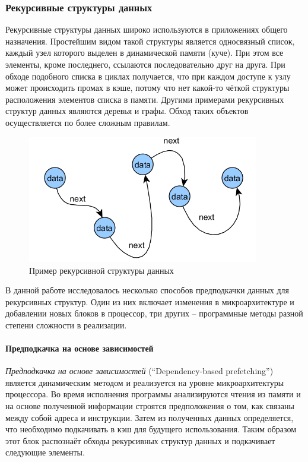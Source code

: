 \documentclass[12pt,a4paper,oneside]{article}
\begin{document}
\subsubsection{Рекурсивные структуры данных}

\indent

Рекурсивные структуры данных широко используются в приложениях общего назначения\cite{LukPhd}. Простейшим видом такой структуры является односвязный список, каждый узел которого выделен в динамической памяти (куче). При этом все элементы, кроме последнего, ссылаются последовательно друг на друга. При обходе подобного списка в циклах получается, что при каждом доступе к узлу может происходить промах в кэше, потому что нет какой-то чёткой структуры расположения элементов списка в памяти. Другими примерами рекурсивных структур данных являются деревья и графы. Обход таких объектов осуществляется по более сложным правилам.

\begin{figure}
  \centering
  \includegraphics[width=0.9\textwidth]{rds.PNG}
  \caption{Пример рекурсивной структуры данных}
\end{figure}


В данной работе исследовалось несколько способов предподкачки данных для рекурсивных структур. Один из них включает изменения в микроархитектуре и добавлении новых блоков в процессор, три других -- программные методы разной степени сложности в реализации.

\paragraph{Предподкачка на основе зависимостей}

\emph{Предподкачка на основе зависимостей} (``Dependency-based prefetching'')\cite{Roth:1998} является динамическим методом и реализуется на уровне микроархитектуры процессора. Во время исполнения программы анализируются чтения из памяти и на основе полученной информации строятся предположения о том, как связаны между собой адреса и инструкции. Затем из полученных данных определяется, что необходимо подкачивать в кэш для будущего использования. Таким образом этот блок распознаёт обходы рекурсивных структур данных и подкачивает следующие элементы.
\end{document}
